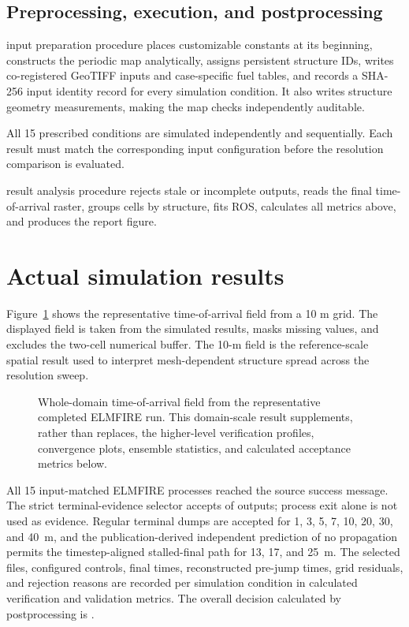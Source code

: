 \subsection{Preprocessing, execution, and postprocessing}

input preparation procedure places customizable constants at its beginning,
constructs the periodic map analytically, assigns persistent structure IDs,
writes co-registered GeoTIFF inputs and case-specific fuel tables, and records a
SHA-256 input identity record for every simulation condition. It also writes
structure geometry measurements, making the map checks independently
auditable.

All 15 prescribed conditions are simulated independently and sequentially.
Each result must match the corresponding input configuration before the
resolution comparison is evaluated.

result analysis procedure rejects stale or incomplete outputs, reads the
final time-of-arrival raster, groups cells by structure, fits ROS, calculates
all metrics above, and produces the report figure.

\section{Actual simulation results}

Figure~\ref{fig:domain-result} shows the representative time-of-arrival field from a 10 m grid.
The displayed field is taken from the simulated results, masks missing values, and excludes
the two-cell numerical buffer.  The 10-m field is the reference-scale spatial result used to interpret mesh-dependent structure spread across the resolution sweep.

\begin{figure}[H]
\centering
{}
\caption{Whole-domain time-of-arrival field from the representative completed ELMFIRE run.  This
domain-scale result supplements, rather than replaces, the higher-level verification
profiles, convergence plots, ensemble statistics, and calculated acceptance metrics below.}
\label{fig:domain-result}
\end{figure}

All 15 input-matched ELMFIRE processes reached the source success
message.  The strict terminal-evidence selector accepts
\CompletedVariantCount{} of \RequestedVariantCount{} outputs; process exit alone is
not used as evidence.  Regular terminal dumps are accepted for 1, 3, 5, 7, 10,
20, 30, and 40~m, and the publication-derived independent prediction of no propagation permits the
timestep-aligned stalled-final path for 13, 17, and 25~m.  The selected files,
configured controls, final times, reconstructed pre-jump times, grid residuals,
and rejection reasons are recorded per simulation condition in
calculated verification and validation metrics. The overall decision calculated by postprocessing is
\textbf{\OverallStatus}.


